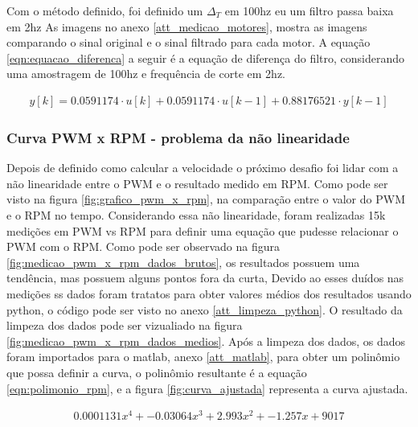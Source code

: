 Com o método definido, foi definido um $\Delta_{T}$ em 100hz eu um filtro passa baixa em 2hz
As imagens no anexo \ref{att_medicao_motores}, mostra as imagens comparando o sinal original e o sinal filtrado para cada motor.
A equação \ref{eqn:equacao_diferenca} a seguir é a equação de diferença do filtro, considerando uma amostragem de 100hz e frequência de corte em 2hz.

\begin{equation}
    \begin{split}
        y[k] = 0.0591174 \cdot u \left[ k \right] +  0.0591174 \cdot u[k - 1] + 0.88176521 \cdot y[k - 1]
    \end{split}
    \label{eqn:equacao_diferenca}
\end{equation}

\subsubsection{Curva PWM x RPM - problema da não linearidade}

Depois de definido como calcular a velocidade o próximo desafio foi lidar com a não linearidade entre o PWM e o resultado medido em RPM.
Como pode ser visto na figura \ref{fig:grafico_pwm_x_rpm}, na comparação entre o valor do PWM e o RPM no tempo.
Considerando essa não linearidade, foram realizadas 15k medições em PWM vs RPM para definir uma equação que pudesse relacionar o PWM com o RPM.
Como pode ser observado na figura  \ref{fig:medicao_pwm_x_rpm_dados_brutos}, os resultados possuem uma tendência, mas possuem alguns pontos fora da curta,
Devido ao esses duídos nas medições ss dados foram tratatos para obter valores médios dos resultados usando python,
o código pode ser visto no anexo \ref{att_limpeza_python}.
O resultado da limpeza dos dados pode ser vizualiado na figura \ref{fig:medicao_pwm_x_rpm_dados_medios}.
Após a limpeza dos dados, os dados foram importados para o matlab, anexo \ref{att_matlab},
para obter um polinômio que possa definir a curva, o polinômio resultante é a equação \ref{eqn:polimonio_rpm}, e a figura \ref{fig:curva_ajustada} representa a curva ajustada.

\begin{equation}
    \begin{split}
        0.0001131x^{4} + -0.03064x^{3} + 2.993x^{2} + -1.257x + 9017
    \end{split}
    \label{eqn:polimonio_rpm}
\end{equation}


